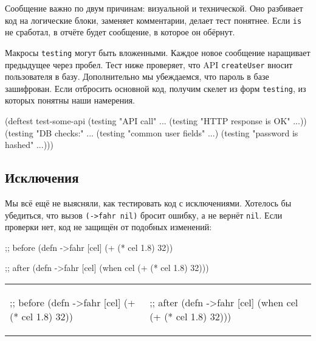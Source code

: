 Сообщение важно по двум причинам: визуальной и технической. Оно разбивает код на
логические блоки, заменяет комментарии, делает тест понятнее. Если \verb|is|
не сработал, в отчёте будет сообщение, в которое он обёрнут.

Макросы \verb|testing| могут быть вложенными. Каждое новое сообщение наращивает
предыдущее через пробел. Тест ниже проверяет, что API \verb|createUser| вносит
пользователя в базу. Дополнительно мы убеждаемся, что пароль в базе
зашифрован. Если отбросить основной код, получим скелет из форм \verb|testing|,
из которых понятны наши намерения.

\begin{english}
  \begin{clojure}
(deftest test-some-api
  (testing "API call" ...
    (testing "HTTP response is OK" ...))
  (testing "DB checks:" ...
    (testing "common user fields" ...)
    (testing "password is hashed" ...)))
  \end{clojure}
\end{english}

\subsection{Исключения}


Мы всё ещё не выясняли, как тестировать код с исключениями. Хотелось бы
убедиться, что вызов \verb|(->fahr nil)| бросит ошибку, а не вернёт
\verb|nil|. Если проверки нет, код не защищён от подобных изменений:

\ifnarrow

\begin{english}
  \begin{clojure}
;; before
(defn ->fahr [cel]
  (+ (* cel 1.8) 32))
  \end{clojure}

\splitter

  \begin{clojure}
;; after
(defn ->fahr [cel]
  (when cel
    (+ (* cel 1.8) 32)))
  \end{clojure}
\end{english}

\else

\begin{english}

\noindent
\begin{tabular}{ @{}p{5cm} @{}p{5cm} }


  \begin{clojure}
;; before
(defn ->fahr [cel]
  (+ (* cel 1.8) 32))
  \end{clojure}

&

  \begin{clojure}
;; after
(defn ->fahr [cel]
  (when cel
    (+ (* cel 1.8) 32)))
  \end{clojure}

\end{tabular}

\end{english}

